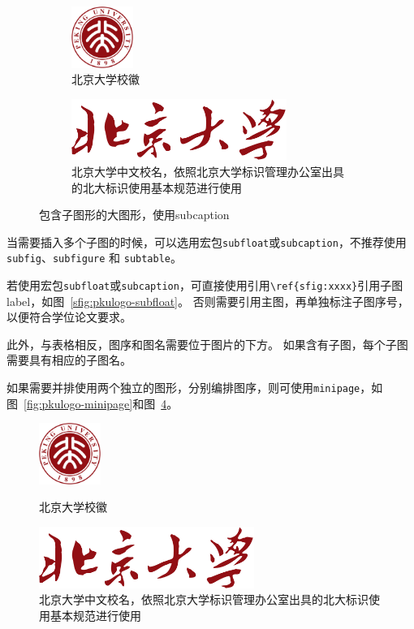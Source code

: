 \begin{figure}[htb]\centering
    \begin{subfigure}[b]{0.25\linewidth}\centering
        \includegraphics[height=2cm]{fig/pkulogo.pdf}
        \caption{北京大学校徽}
        \label{sfig:pkulogo-subcaption}\end{subfigure}\hfil
    \begin{subfigure}[b]{0.5\linewidth}\centering
        \includegraphics[height=2cm]{fig/pkuword.pdf}
        \caption{北京大学中文校名，依照北京大学标识管理办公室出具的北大标识使用基本规范进行使用}
        \label{sfig:pkuword-subcaption}\end{subfigure}\hfil
    \caption{包含子图形的大图形，使用subcaption}
    \label{fig:example-fig-subcaption}
\end{figure}

当需要插入多个子图的时候，可以选用宏包\verb|subfloat|或\verb|subcaption|，不推荐使用
\verb|subfig|、\verb|subfigure| 和 \verb|subtable|。

若使用宏包\verb|subfloat|或\verb|subcaption|，可直接使用引用\verb|\ref{sfig:xxxx}|引用子图label，如图~\ref{sfig:pkulogo-subfloat}。
否则需要引用主图，再单独标注子图序号，以便符合学位论文要求。

此外，与表格相反，图序和图名需要位于图片的下方。
如果含有子图，每个子图需要具有相应的子图名。

如果需要并排使用两个独立的图形，分别编排图序，则可使用\verb|minipage|，如图~\ref{fig:pkulogo-minipage}和图~\ref{fig:pkuword-minipage}。

\begin{figure}[htb]\centering
    \begin{minipage}{0.25\linewidth}\centering
        \includegraphics[height=2cm]{fig/pkulogo.pdf}
        \caption{北京大学校徽}
        \label{fig:pkulogo-minipage}
    \end{minipage}\hfil
    \begin{minipage}{0.5\linewidth}\centering
        \includegraphics[height=2cm]{fig/pkuword.pdf}
        \caption{北京大学中文校名，依照北京大学标识管理办公室出具的北大标识使用基本规范进行使用}
        \label{fig:pkuword-minipage}
    \end{minipage}
\end{figure}

